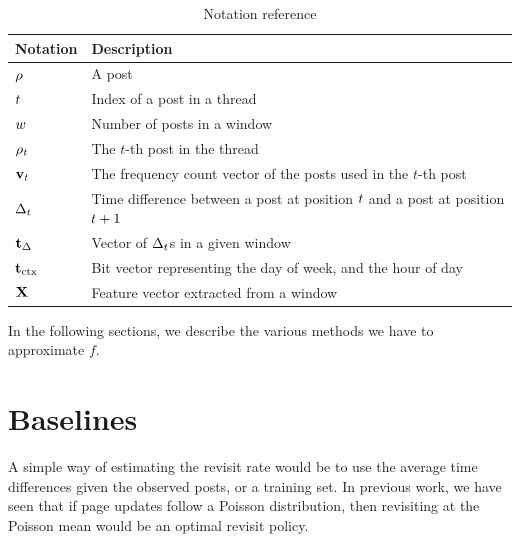 \begin{table}
	\begin{center}
	\begin{tabular}{l l}
	\hline
Notation	&	Description\\
	\hline
$\rho$		&	A post\\
$t$		&	Index of a post in a thread\\
$w$		&	Number of posts in a window\\
$\rho_t$	&	The $t$-th post in the thread\\
$\mathbf{v}_t$	&	The frequency count vector of the posts used in the $t$-th 
	post\\
$\Delta_t$		&	Time difference between a post at position $t$ and a post at 
	position $t+1$ \\
$\mathbf{t}_\Delta$	&	Vector of $\Delta_t$s in a given window\\
$\mathbf{t}_\text{ctx}$	&	Bit vector representing the day of week, and the hour of day\\
$\mathbf{X}$		&	Feature vector extracted from a window\\
	\hline
	\end{tabular}
\end{center}
\caption{Notation reference} \label{table:notations}
\end{table}

%
%


In the following sections, we describe the various methods we have to 
approximate $f$.

\section{Baselines}
A simple way of estimating the revisit rate would be to use the average time 
differences given the observed posts, or a training set. In previous work, we 
have seen that if page updates follow a Poisson distribution, then revisiting at 
the Poisson mean would be an optimal revisit policy. %

